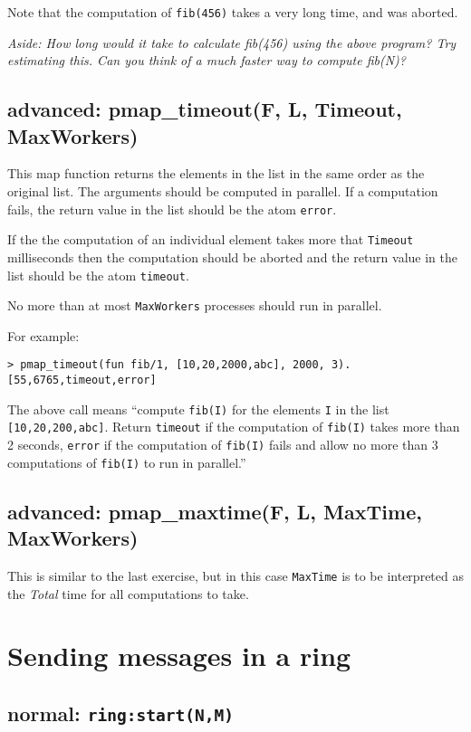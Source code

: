 \documentclass[12pt]{hitec}
\begin{document}
Note that the computation of \verb+fib(456)+ takes a very long time,
and was aborted.

{\sl Aside: How long would it take to calculate fib(456) using the above program?
Try estimating this. Can you think of a much faster way to compute fib(N)?}

\subsection{advanced: pmap\_timeout(F, L, Timeout, MaxWorkers)}

This map function returns the elements in the list in the same order
as the original list. The arguments should be computed in parallel. If
a computation fails, the return value in the list should be the atom
\verb+error+.

If the the computation of an individual element takes more that
\verb+Timeout+ milliseconds then the computation should be aborted and
the return value in the list should be the atom \verb+timeout+.

No more than at most \verb+MaxWorkers+ processes should run in parallel.

For example:

\begin{Verbatim}
> pmap_timeout(fun fib/1, [10,20,2000,abc], 2000, 3).
[55,6765,timeout,error]
\end{Verbatim}

The above call means ``compute \verb+fib(I)+ for the elements \verb+I+
in the list \verb+[10,20,200,abc]+. Return \verb+timeout+ if the
computation of \verb+fib(I)+ takes more than 2 seconds, \verb+error+
if the computation of \verb+fib(I)+ fails and allow no more than 3
computations of \verb+fib(I)+ to run in parallel.''

\subsection{advanced: pmap\_maxtime(F, L, MaxTime, MaxWorkers)}

This is similar to the last exercise, but in this case \verb+MaxTime+ is to
be interpreted as the {\sl Total} time for all computations to take.

\section{Sending messages in a ring}

\subsection{normal: \texttt{ring:start(N,M)}}
\end{document}
